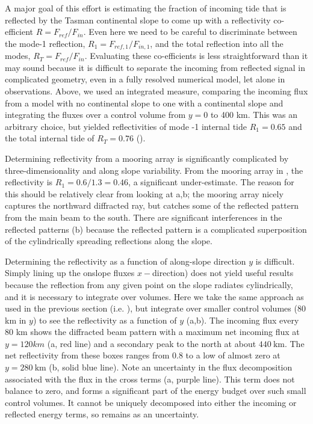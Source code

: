 \documentclass[10pt]{article}
\begin{document}
A major goal of this effort is estimating the fraction of incoming tide that is reflected by the Tasman continental slope to come up with a reflectivity co-efficient $R=F_{ref}/F_{in}$. Even here we need to be careful to discriminate between the mode-1 reflection, $R_1=F_{ref,1}/F_{in,1}$, and the total reflection into all the modes, $R_T=F_{ref}/F_{in}$. Evaluating these co-efficients is less straightforward than it may sound because it is difficult to separate the incoming from reflected signal in complicated geometry, even in a fully resolved numerical model, let alone in observations.  Above, we used an integrated measure, comparing the incoming flux from a model with no continental slope to one with a continental slope and integrating the fluxes over a control volume from $y=$0 to 400 km.  This was an arbitrary choice, but yielded reflectivities of mode -1 internal tide $R_1=0.65$ and the total internal tide of $R_T=0.76$ (). 

Determining reflectivity from a mooring array is significantly complicated by three-dimensionality and along slope variability.  From the mooring array in , the reflectivity is $R_1=0.6/1.3=0.46$, a significant under-estimate.  The reason for this should be relatively clear from looking at a,b; the mooring array nicely captures the northward diffracted ray, but catches some of the reflected pattern from the main beam to the south. There are significant interferences in the reflected patterns (b) because the reflected pattern is a complicated superposition of the cylindrically spreading reflections along the slope.  

Determining the reflectivity as a function of along-slope direction $y$ is difficult.  Simply lining up the onslope fluxes $x-$direction) does not yield useful results because the reflection from any given point on the slope radiates cylindrically, and it is necessary to integrate over volumes.  Here we take the same approach as used in the previous section (i.e. ), but integrate over smaller control volumes (80 km in $y$) to see the reflectivity as a function of $y$ (a,b).  The incoming flux every 80 km shows the diffracted beam pattern with a maximum net incoming flux at $y=120 km$ (a, red line) and a secondary peak to the north at about $440\ \mathrm{km}$.  The net reflectivity from these boxes ranges from 0.8 to a low of almost zero at $y=280\ \mathrm{km}$ (b, solid blue line).  Note an uncertainty in the flux decomposition associated with the flux in the cross terms (a, purple line).  This term does not balance to zero, and forms a significant part of the energy budget over such small control volumes.  It cannot be uniquely decomposed into either the incoming or reflected energy terms, so remains as an uncertainty. 
\end{document}
